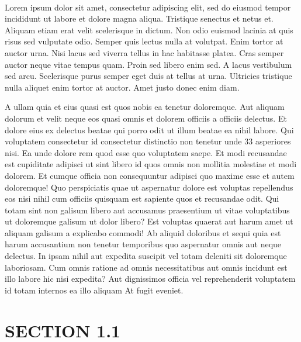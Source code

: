 \documentclass[a4paper,12pt]{report}
\begin{document}
\paragraph{}
Lorem ipsum dolor sit amet, consectetur adipiscing elit, sed do eiusmod tempor incididunt ut labore et dolore magna aliqua. Tristique senectus et netus et. Aliquam etiam erat velit scelerisque in dictum. Non odio euismod lacinia at quis risus sed vulputate odio. Semper quis lectus nulla at volutpat. Enim tortor at auctor urna. Nisi lacus sed viverra tellus in hac habitasse platea. Cras semper auctor neque vitae tempus quam. Proin sed libero enim sed. A lacus vestibulum sed arcu. Scelerisque purus semper eget duis at tellus at urna. Ultricies tristique nulla aliquet enim tortor at auctor. Amet justo donec enim diam.
\par A ullam quia et eius quasi est quos nobis ea tenetur doloremque. Aut aliquam dolorum et velit neque eos quasi omnis et dolorem officiis a officiis delectus. Et dolore eius ex delectus beatae qui porro odit ut illum beatae ea nihil labore. Qui voluptatem consectetur id consectetur distinctio non tenetur unde 33 asperiores nisi. Ea unde dolore rem quod esse quo voluptatem saepe. Et modi recusandae est cupiditate adipisci ut sint libero id quos omnis non mollitia molestiae et modi dolorem. Et cumque officia non consequuntur adipisci quo maxime esse et autem doloremque! Quo perspiciatis quae ut aspernatur dolore est voluptas repellendus eos nisi nihil cum officiis quisquam est sapiente quos et recusandae odit. Qui totam sint non galisum libero aut accusamus praesentium ut vitae voluptatibus ut doloremque galisum ut dolor libero? Est voluptas quaerat aut harum amet ut aliquam galisum a explicabo commodi! Ab aliquid doloribus et sequi quia est harum accusantium non tenetur temporibus quo aspernatur omnis aut neque delectus. In ipsam nihil aut expedita suscipit vel totam deleniti sit doloremque laboriosam. Cum omnis ratione ad omnis necessitatibus aut omnis incidunt est illo labore hic nisi expedita? Aut dignissimos officia vel reprehenderit voluptatem id totam internos ea illo aliquam At fugit eveniet. 
\section{SECTION 1.1}
\end{document}
